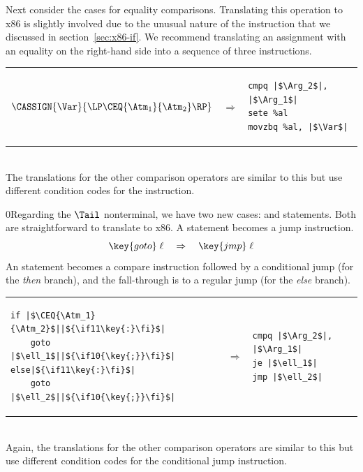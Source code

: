 \documentclass[7x10]{TimesAPriori_MIT}%
\def\racketEd{0}
\def\pythonEd{1}
\def\edition{1}
\newcommand{\racket}[1]{{\if\edition\racketEd{#1}\fi}}
\newcommand{\pythonColor}[0]{}
\newcommand{\python}[1]{{\if\edition\pythonEd\pythonColor #1\fi}}
\numberwithin{theorem}{chapter}
\numberwithin{definition}{chapter}
\numberwithin{equation}{chapter}
\begin{document}
Next consider the cases for equality comparisons.  Translating this
operation to x86 is slightly involved due to the unusual nature of the
 instruction that we discussed in section~\ref{sec:x86-if}.
We recommend translating an assignment with an equality on the
right-hand side into a sequence of three instructions. \\
\begin{tabular}{lll}
\begin{minipage}{0.4\textwidth}
$\CASSIGN{\Var}{ \LP\CEQ{\Atm_1}{\Atm_2} \RP }$ 
\end{minipage}
&
$\Rightarrow$
&
\begin{minipage}{0.4\textwidth}
\begin{lstlisting}
cmpq |$\Arg_2$|, |$\Arg_1$|
sete %al
movzbq %al, |$\Var$|
\end{lstlisting}
\end{minipage}
\end{tabular}  \\
The translations for the other comparison operators are similar to
this but use different condition codes for the  instruction.

\racket{Regarding the $\Tail$ nonterminal, we have two new cases:
  \key{goto} and \key{if} statements. Both are straightforward to
  translate to x86.}
%
A  statement becomes a jump instruction.
\[
\key{goto}\; \ell\racket{\key{;}} \quad \Rightarrow \quad \key{jmp}\;\ell
\]
%
An  statement becomes a compare instruction followed by a
conditional jump (for the \emph{then} branch), and the fall-through is to
a regular jump (for the \emph{else} branch).\\
\begin{tabular}{lll}
\begin{minipage}{0.4\textwidth}
\begin{lstlisting}
if |$\CEQ{\Atm_1}{\Atm_2}$||$\python{\key{:}}$|
    goto |$\ell_1$||$\racket{\key{;}}$|
else|$\python{\key{:}}$|
    goto |$\ell_2$||$\racket{\key{;}}$|
\end{lstlisting}
\end{minipage}
&
$\Rightarrow$
&
\begin{minipage}{0.4\textwidth}
\begin{lstlisting}
cmpq |$\Arg_2$|, |$\Arg_1$|
je |$\ell_1$|
jmp |$\ell_2$|
\end{lstlisting}
\end{minipage}
\end{tabular}  \\
Again, the translations for the other comparison operators are similar to this
but use different condition codes for the conditional jump instruction.
\end{document}
